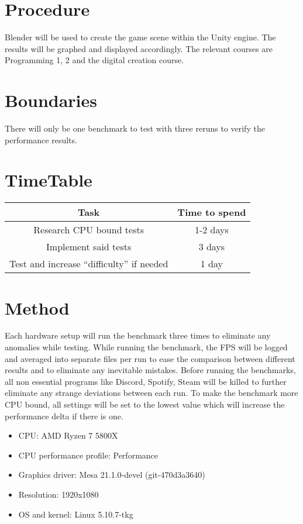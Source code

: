 \documentclass{article}
\begin{document}
\section{Procedure}
Blender will be used to create the game scene within the Unity engine. The results will be graphed and displayed accordingly. The relevant courses are Programming 1, 2 and the digital creation course.

\section {Boundaries}
There will only be one benchmark to test with three reruns to verify the performance results.

\section {TimeTable}
\begin{center}
\begin{tabular}{ |c|c| } 
 \hline
    \textbf {Task} & \textbf {Time to spend} \\ [0.5ex] 
 \hline\hline
    Research CPU bound tests & 1-2 days \\ 
    \hline
    Implement said tests & 3 days \\ 
    \hline
    Test and increase “difficulty” if needed & 1 day \\ 
 \hline
\end{tabular}
\end{center}


\section {Method}
Each hardware setup will run the benchmark three times to eliminate any anomalies while testing. While running the benchmark, the FPS will be logged and averaged into separate files per run to ease the comparison between different results and to eliminate any inevitable mistakes. Before running the benchmarks, all non essential programs like Discord, Spotify, Steam will be killed to further eliminate any strange deviations between each run. To make the benchmark more CPU bound, all settings will be set to the lowest value which will increase the performance delta if there is one.

\begin{itemize}
    \item CPU: AMD Ryzen 7 5800X
    \item CPU performance profile: Performance
    \item Graphics driver: Mesa 21.1.0-devel (git-470d3a3640)
    \item Resolution: 1920x1080
    \item OS and kernel: Linux 5.10.7-tkg
\end{itemize}




\end{document}
